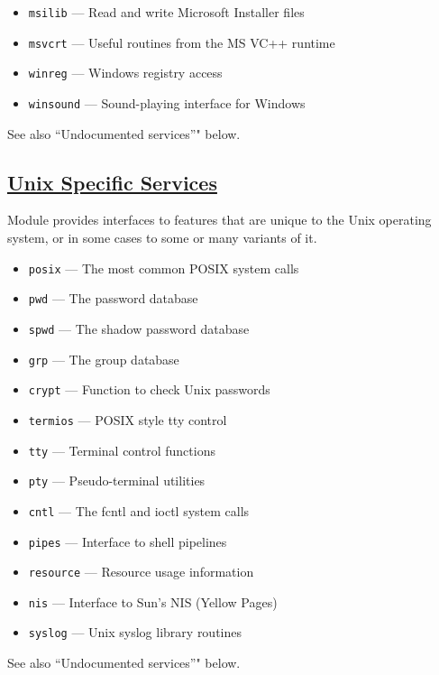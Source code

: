 \documentclass[]{book}
\providecommand{\tightlist}{%
  \setlength{\itemsep}{0pt}\setlength{\parskip}{0pt}}
\theoremstyle{definition}
\theoremstyle{definition}
\theoremstyle{definition}
\theoremstyle{remark}
\begin{document}
\begin{itemize}
\tightlist
\item
  \texttt{msilib} --- Read and write Microsoft Installer files
\item
  \texttt{msvcrt} --- Useful routines from the MS VC++ runtime
\item
  \texttt{winreg} --- Windows registry access
\item
  \texttt{winsound} --- Sound-playing interface for Windows
\end{itemize}

See also ``Undocumented services''" below.

\subsection{\texorpdfstring{\href{https://docs.python.org/3.7/library/unix.html}{Unix
Specific
Services}}{Unix Specific Services}}\label{unix-specific-services}

Module provides interfaces to features that are unique to the Unix
operating system, or in some cases to some or many variants of it.

\begin{itemize}
\tightlist
\item
  \texttt{posix} --- The most common POSIX system calls
\item
  \texttt{pwd} --- The password database
\item
  \texttt{spwd} --- The shadow password database
\item
  \texttt{grp} --- The group database
\item
  \texttt{crypt} --- Function to check Unix passwords
\item
  \texttt{termios} --- POSIX style tty control
\item
  \texttt{tty} --- Terminal control functions
\item
  \texttt{pty} --- Pseudo-terminal utilities
\item
  \texttt{cntl} --- The fcntl and ioctl system calls
\item
  \texttt{pipes} --- Interface to shell pipelines
\item
  \texttt{resource} --- Resource usage information
\item
  \texttt{nis} --- Interface to Sun's NIS (Yellow Pages)
\item
  \texttt{syslog} --- Unix syslog library routines
\end{itemize}

See also ``Undocumented services''" below.
\end{document}
